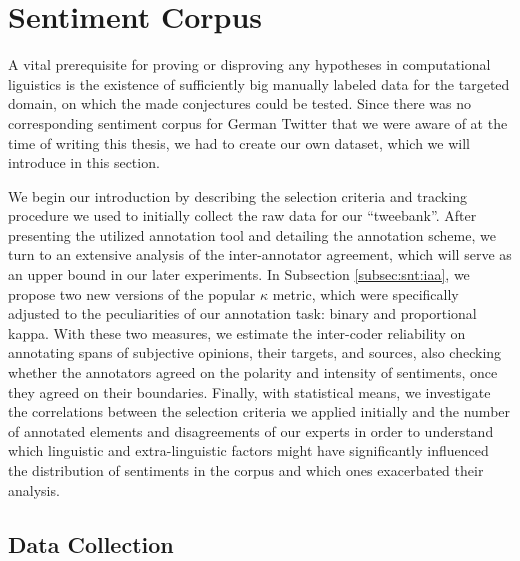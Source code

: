 

\section{Sentiment Corpus}\label{sec:snt:corpus}

A vital prerequisite for proving or disproving any hypotheses in
computational liguistics is the existence of sufficiently big manually
labeled data for the targeted domain, on which the made conjectures
could be tested.  Since there was no corresponding sentiment corpus
for German Twitter that we were aware of at the time of writing this
thesis, we had to create our own dataset, which we will introduce in
this section.

We begin our introduction by describing the selection criteria and
tracking procedure we used to initially collect the raw data for our
``tweebank''.  After presenting the utilized annotation tool and
detailing the annotation scheme, we turn to an extensive analysis of
the inter-annotator agreement, which will serve as an upper bound in
our later experiments.  In Subsection \ref{subsec:snt:iaa}, we propose
two new versions of the popular $\kappa$ metric, which were
specifically adjusted to the peculiarities of our annotation task:
binary and proportional kappa.  With these two measures, we estimate
the inter-coder reliability on annotating spans of subjective
opinions, their targets, and sources, also checking whether the
annotators agreed on the polarity and intensity of sentiments, once
they agreed on their boundaries.  Finally, with statistical means, we
investigate the correlations between the selection criteria we applied
initially and the number of annotated elements and disagreements of
our experts in order to understand which linguistic and
extra-linguistic factors might have significantly influenced the
distribution of sentiments in the corpus and which ones exacerbated
their analysis.

\subsection{Data Collection}


